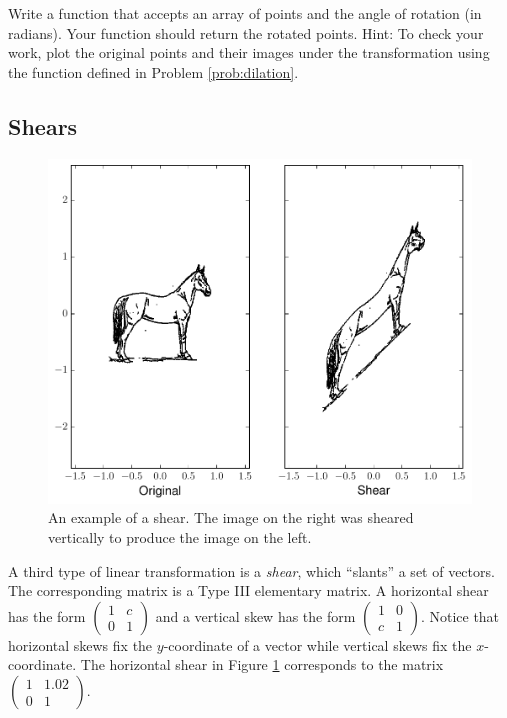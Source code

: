 \begin{problem}
 Write a function that accepts an array of points and the angle of rotation (in radians). 
 Your function should return the rotated points. 
 Hint: To check your work, plot the original points and their images under the transformation using the function  defined in Problem \ref{prob:dilation}.
\end{problem}

\subsection*{Shears} %

\begin{figure}
\includegraphics[width=\textwidth]{shear.pdf}
\caption{An example of a shear.
The image on the right was sheared vertically to produce the image on the left.}
\label{fig:shear}
\end{figure}

A third type of linear transformation is a \emph{shear}, which ``slants'' a set of vectors. 
The corresponding matrix is a Type III elementary matrix. 
A horizontal shear has the form $\begin{pmatrix}
1 & c \\
0 & 1
\end{pmatrix}$ and a vertical skew has the form $
 \begin{pmatrix}
1 & 0 \\
c & 1
\end{pmatrix}
$. 
Notice that horizontal skews fix the $y$-coordinate of a vector while vertical skews fix the $x$-coordinate. 
The horizontal shear in Figure \ref{fig:shear} corresponds to the matrix $\begin{pmatrix}
1 & 1.02 \\
0 & 1
\end{pmatrix}
$.


